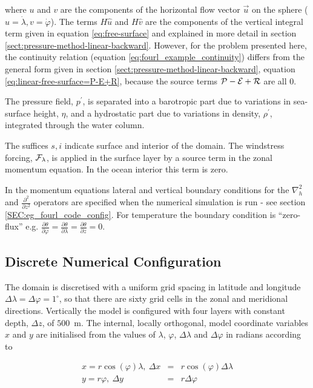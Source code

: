 \noindent where $u$ and $v$ are the components of the horizontal
flow vector $\vec{u}$ on the sphere ($u=\dot{\lambda},v=\dot{\varphi}$).
The terms $H\widehat{u}$ and $H\widehat{v}$ are the components of the vertical
integral term given in equation \ref{eq:free-surface} and
explained in more detail in section \ref{sect:pressure-method-linear-backward}.
However, for the problem presented here, the continuity relation (equation
\ref{eq:fourl_example_continuity}) differs from the general form given
in section \ref{sect:pressure-method-linear-backward},
equation \ref{eq:linear-free-surface=P-E+R}, because the source terms
${\cal P}-{\cal E}+{\cal R}$ 
are all $0$.

The pressure field, $p^{\prime}$, is separated into a barotropic part
due to variations in sea-surface height, $\eta$, and a hydrostatic
part due to variations in density, $\rho^{\prime}$, integrated
through the water column.

The suffices ${s},{i}$ indicate surface and interior of the domain.
The windstress forcing, ${\cal F}_{\lambda}$, is applied in the surface layer 
by a source term in the zonal momentum equation. In the ocean interior
this term is zero.

In the momentum equations
lateral and vertical boundary conditions for the $\nabla_{h}^{2}$
and $\frac{\partial^{2}}{\partial z^{2}}$ operators are specified
when the numerical simulation is run - see section 
\ref{SEC:eg_fourl_code_config}. For temperature
the boundary condition is ``zero-flux'' 
e.g. $\frac{\partial \theta}{\partial \varphi}=
\frac{\partial \theta}{\partial \lambda}=\frac{\partial \theta}{\partial z}=0$.



\subsection{Discrete Numerical Configuration}

 The domain is discretised with 
a uniform grid spacing in latitude and longitude
 $\Delta \lambda=\Delta \varphi=1^{\circ}$, so 
that there are sixty grid cells in the zonal and meridional directions. 
Vertically the 
model is configured with four layers with constant depth, 
$\Delta z$, of $500$~m. The internal, locally orthogonal, model coordinate 
variables $x$ and $y$ are initialised from the values of
$\lambda$, $\varphi$, $\Delta \lambda$ and $\Delta \varphi$ in
radians according to

\begin{eqnarray}
x=r\cos(\varphi)\lambda,~\Delta x & = &r\cos(\varphi)\Delta \lambda \\
y=r\varphi,~\Delta y &= &r\Delta \varphi
\end{eqnarray}


